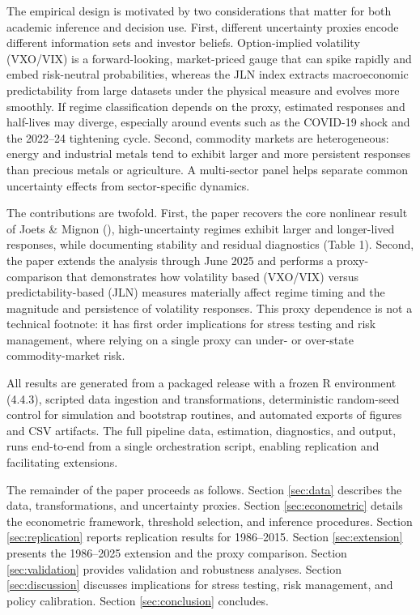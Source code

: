 \documentclass[
  11pt,
]{article}
\begin{document}
The empirical design is motivated by two considerations that matter for both academic inference and decision use. First, different uncertainty proxies encode different information sets and investor beliefs. Option-implied volatility (VXO/VIX) is a forward-looking, market-priced gauge that can spike rapidly and embed risk-neutral probabilities, whereas the JLN index extracts macroeconomic predictability from large datasets under the physical measure and evolves more smoothly. If regime classification depends on the proxy, estimated responses and half-lives may diverge, especially around events such as the COVID-19 shock and the 2022--24 tightening cycle. Second, commodity markets are heterogeneous: energy and industrial metals tend to exhibit larger and more persistent responses than precious metals or agriculture. A multi-sector panel helps separate common uncertainty effects from sector-specific dynamics.

The contributions are twofold. First, the paper recovers the core nonlinear result of Joets \& Mignon (), high-uncertainty regimes exhibit larger and longer-lived responses, while documenting stability and residual diagnostics (Table 1). Second, the paper extends the analysis through June 2025 and performs a proxy-comparison that demonstrates how volatility based (VXO/VIX) versus predictability-based (JLN) measures materially affect regime timing and the magnitude and persistence of volatility responses. This proxy dependence is not a technical footnote: it has first order implications for stress testing and risk management, where relying on a single proxy can under- or over-state commodity-market risk.

All results are generated from a packaged release with a frozen R environment (4.4.3), scripted data ingestion and transformations, deterministic random-seed control for simulation and bootstrap routines, and automated exports of figures and CSV artifacts. The full pipeline data, estimation, diagnostics, and output, runs end-to-end from a single orchestration script, enabling replication and facilitating extensions.

The remainder of the paper proceeds as follows. Section \ref{sec:data} describes the data, transformations, and uncertainty proxies. Section \ref{sec:econometric} details the econometric framework, threshold selection, and inference procedures. Section \ref{sec:replication} reports replication results for 1986--2015. Section \ref{sec:extension} presents the 1986--2025 extension and the proxy comparison. Section \ref{sec:validation} provides validation and robustness analyses. Section \ref{sec:discussion} discusses implications for stress testing, risk management, and policy calibration. Section \ref{sec:conclusion} concludes.
\end{document}
